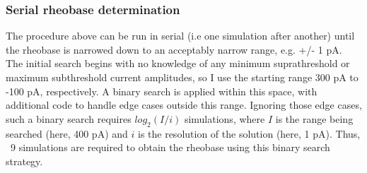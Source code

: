 \subsubsection{Serial rheobase determination}
The procedure above can be run in serial (i.e one simulation after another) until the rheobase is narrowed down to an acceptably narrow range, e.g. +/- 1 pA.
The initial search begins with no knowledge of any minimum suprathreshold or maximum subthreshold current amplitudes, so I use the starting range 300 pA to -100 pA, respectively.
A binary search is applied within this space, with additional code to handle edge cases outside this range.
Ignoring those edge cases, such a binary search requires $log_2(I/i)$ simulations, where $I$ is the range being searched (here, 400 pA) and $i$ is the resolution of the solution (here, 1 pA).
Thus, ~9 simulations are required to obtain the rheobase using this binary search strategy.

